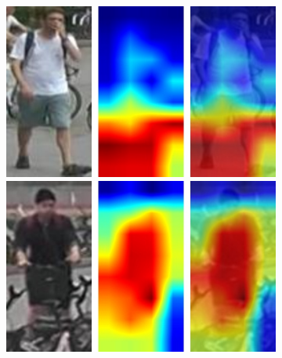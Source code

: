 \begin{figure}
    \vspace{5 pt}
    
    \begin{subfigure}[b]{0.98\textwidth}
        \centering
        \includegraphics[width=0.45\columnwidth]{5_unlearn/figs/scrub/0006_mob_rem1.jpg}
        \hspace{15pt}
        \includegraphics[width=0.45\columnwidth]{5_unlearn/figs/scrub/0014_mob_ret1.jpg}
    \end{subfigure}
    
    \vspace{5 pt}
    
    \begin{subfigure}[b]{0.98\textwidth}
        \centering
    \hspace{15pt}
    

\end{subfigure}
\end{figure}
